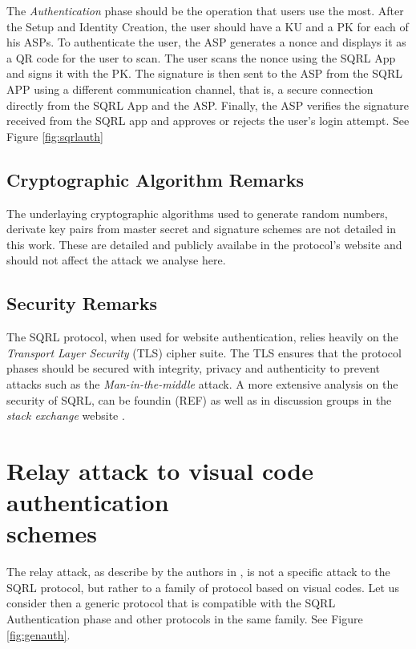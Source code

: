 \documentclass{article}
\begin{document}
	The \emph{Authentication} phase should be the operation that users use the
	most. After the Setup and Identity Creation, the user should have a KU and
	a PK for each of his ASPs. To authenticate the user, the ASP generates a 
	nonce and displays it as a QR code for the user to scan. The user scans the
	nonce using the SQRL App and signs it with the PK. The signature is then
	sent to the ASP from the SQRL APP using a different communication channel,
	that is, a secure connection directly from the SQRL App and the ASP.
	Finally, the ASP verifies the signature received from the SQRL app and 
	approves or rejects the user's login attempt. See Figure \ref{fig:sqrlauth}

	

\subsection{Cryptographic Algorithm Remarks}
	The underlaying cryptographic algorithms used to generate random numbers, derivate
	key pairs from master secret and signature schemes are not detailed in this work.
	These are detailed and publicly availabe in the protocol's website \cite{sqrl} and should not
	affect the attack we analyse here. 

\subsection{Security Remarks}
	The SQRL protocol, when used for website authentication, relies heavily on
	the \emph{Transport Layer Security} (TLS) cipher suite. The TLS ensures that
	the protocol phases should be secured with integrity, privacy and authenticity
	to prevent attacks such as the \emph{Man-in-the-middle} attack. A more extensive 
	analysis on the security of SQRL, can be foundin (REF) as well as in discussion 
	groups in the \emph{stack exchange} website \cite{sqrlreport}.


\section[Relay attack to visual code authentication schemes]{Relay attack to visual code
authentication \\ schemes}
	The relay attack, as describe by the authors in \cite{relayattack}, is not a specific
	attack to the SQRL protocol, but rather to a family of protocol based on
	visual codes. Let us consider then a generic protocol that is compatible
	with the SQRL Authentication phase and other protocols in the same family.
	See Figure \ref{fig:genauth}.
\end{document}
